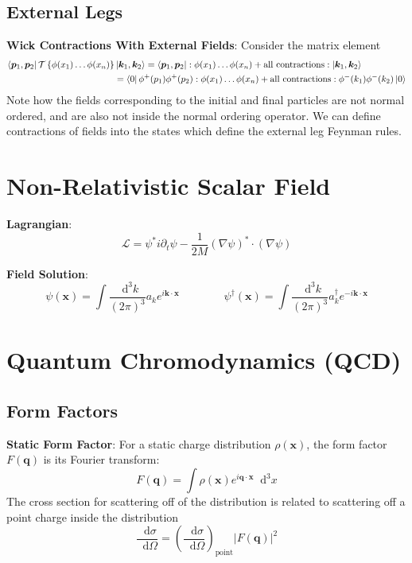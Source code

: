 \documentclass[12pt]{article}
\newcommand{\diff}{\mathop{}\!\mathrm{d}}
\theoremstyle{definition}
\begin{document}
\subsection{External Legs}
\textbf{Wick Contractions With External Fields}: Consider the matrix element
\begin{equation*}
\begin{split}
    \bra{\bm{p}_1, \bm{p}_2} \mathcal{T}\left\{ \phi(x_1) \dots \phi(x_n) \right\} &\ket{\bm{k}_1, \bm{k}_2}
        = \bra{\bm{p}_1, \bm{p}_2} :\phi(x_1) \dots \phi(x_n) + \text{all contractions}: \ket{\bm{k}_1, \bm{k}_2} \\
        &= \bra{0} \phi^+(p_1) \phi^+(p_2) :\phi(x_1) \dots \phi(x_n) + \text{all contractions}: \phi^-(k_1) \phi^-(k_2) \ket{0} \\
\end{split}
\end{equation*}
Note how the fields corresponding to the initial and final particles are not normal ordered, and are also
not inside the normal ordering operator. We can define contractions of fields into the states which
define the external leg Feynman rules. 

\section{Non-Relativistic Scalar Field}

\textbf{Lagrangian}:
\begin{equation*}
    \mathcal{L} = \psi^* i \partial_t \psi - \frac{1}{2M} (\nabla\psi)^* \cdot (\nabla\psi)
\end{equation*}

\textbf{Field Solution}:
\begin{equation*}
    \psi(\bm{x}) = \int \frac{\diff^3 k}{(2\pi)^3} a_k e^{i \bm{k} \cdot \bm{x}}  \qquad \qquad
    \psi^\dagger(\bm{x}) = \int \frac{\diff^3 k}{(2\pi)^3} a^\dagger_k e^{-i \bm{k} \cdot \bm{x}} 
\end{equation*}

\section{Quantum Chromodynamics (QCD)}

\subsection{Form Factors}
\textbf{Static Form Factor}: For a static charge distribution $\rho(\bm{x})$, the form factor
$F(\bm{q})$ is its Fourier transform:
\begin{equation*}
    F(\bm{q}) = \int \rho(\bm{x}) e^{i \bm{q} \cdot \bm{x}} \diff^3 x
\end{equation*}
The cross section for scattering off of the distribution is related to scattering off a point charge
inside the distribution
\begin{equation*}
    \frac{\diff \sigma}{\diff \Omega} = \left( \frac{\diff \sigma}{\diff \Omega}  \right)_{\text{point}} |F(\bm{q})|^2 
\end{equation*}
\end{document}
